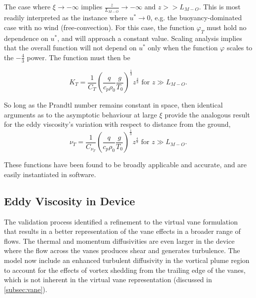 The case where $\xi \to -\infty $ implies $\frac{z}{L_{M-O}} \to
-\infty $ and $z>>L_{M-O}$. This is most readily interpreted as the instance
where $u^* \to 0$, e.g. the buoyancy-dominated case with no wind
(free-convection). For this case, the function $\varphi_T$ must hold no
dependence on $u^*$, and will approach a constant value. Scaling
analysis implies that the overall function will not depend on $u^*$ only
when the function $\varphi$ scales to the $-\frac{4}{3}$ power. The
function must then be

\begin{equation}
 K_T = \frac{1}{C_T} \left( \frac{q}{c_p \rho_0} \frac{g}{T_0}
		     \right)^\frac{1}{3} z^{\frac{4}{3}}  \text{ 
for } z \gg L_{M-O}. 
\end{equation}

So long as the Prandtl number remains constant in space, then
identical arguments as to the asymptotic behaviour at large $\xi$ provide
the analogous result for the eddy viscosity's variation with respect to
distance from the ground,  
\begin{equation}
 \nu_T = \frac{1}{C_{\nu_T}} \left( \frac{q}{c_p \rho_0} \frac{g}{T_0}
			     \right)^\frac{1}{3} z^{\frac{4}{3}}  \text{ 
for } z \gg L_{M-O}. 
\end{equation}

These functions have been found to be broadly applicable and
accurate\cite{Foken2006}, and are easily instantiated in software.

\subsection{Eddy Viscosity in Device}

The validation process identified a refinement to the virtual vane
formulation that results in a better representation of the vane
effects in a broader range of flows. The thermal and momentum
diffusivities are even larger in the device where the flow across the
vanes produces shear and generates turbulence. The model now include an
enhanced turbulent diffusivity in the vortical plume region to account
for the effects of vortex shedding from the trailing edge of the vanes,
which is not inherent in the virtual vane representation (discussed in
\ref{subsec:vane}). 


